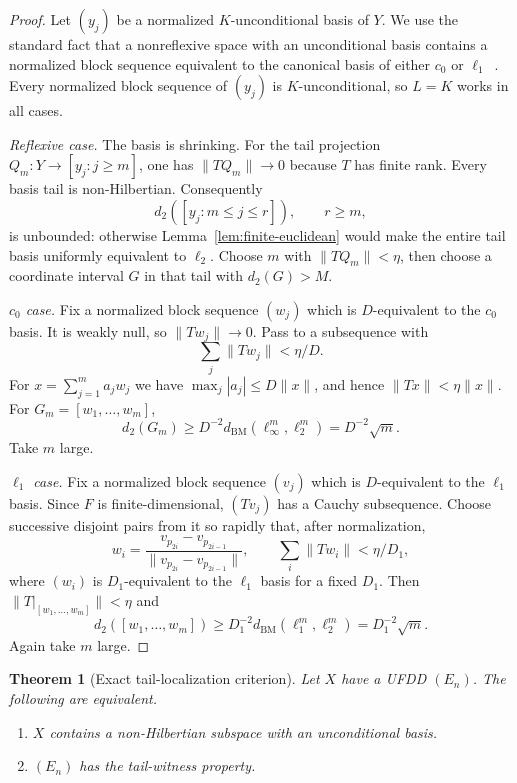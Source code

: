 \documentclass[11pt]{article}
\newtheorem{theorem}{Theorem}[section]
\theoremstyle{definition}
\newcommand{\dd}{d_2}
\newcommand{\BM}{d_{\mathrm{BM}}}
\begin{document}
\begin{proof}
Let $(y_j)$ be a normalized $K$-unconditional basis of $Y$.  We use the
standard fact that a nonreflexive space with an unconditional basis contains a
normalized block sequence equivalent to the canonical basis of either $c_0$ or
$\ell_1$~\cite{AK}.  Every normalized block sequence of $(y_j)$ is
$K$-unconditional, so $L=K$ works in all cases.

\emph{Reflexive case.}
The basis is shrinking.  For the tail projection
$Q_m:Y\to[y_j:j\geq m]$, one has $\|TQ_m\|\to0$ because $T$ has finite rank.
Every basis tail is non-Hilbertian.  Consequently
\[
 \dd([y_j:m\leq j\leq r]),\qquad r\geq m,
\]
is unbounded: otherwise Lemma~\ref{lem:finite-euclidean} would make the
entire tail basis uniformly equivalent to $\ell_2$.  Choose $m$ with
$\|TQ_m\|<\eta$, then choose a coordinate interval $G$ in that tail with
$\dd(G)>M$.

\emph{$c_0$ case.}
Fix a normalized block sequence $(w_j)$ which is $D$-equivalent to the
$c_0$ basis.  It is weakly null, so $\|Tw_j\|\to0$.  Pass to a subsequence
with
\[
  \sum_j\|Tw_j\|<\eta/D.
\]
For $x=\sum_{j=1}^m a_jw_j$ we have $\max_j|a_j|\leq D\|x\|$, and hence
$\|Tx\|<\eta\|x\|$.  For $G_m=[w_1,\ldots,w_m]$,
\[
  \dd(G_m)\geq D^{-2}\BM(\ell_\infty^m,\ell_2^m)
             =D^{-2}\sqrt m.
\]
Take $m$ large.

\emph{$\ell_1$ case.}
Fix a normalized block sequence $(v_j)$ which is $D$-equivalent to the
$\ell_1$ basis.  Since $F$ is finite-dimensional, $(Tv_j)$ has a Cauchy
subsequence.  Choose successive disjoint pairs from it so rapidly that, after
normalization,
\[
 w_i=\frac{v_{p_{2i}}-v_{p_{2i-1}}}
          {\|v_{p_{2i}}-v_{p_{2i-1}}\|},
 \qquad
 \sum_i\|Tw_i\|<\eta/D_1,
\]
where $(w_i)$ is $D_1$-equivalent to the $\ell_1$ basis for a fixed $D_1$.
Then $\|T|_{[w_1,\ldots,w_m]}\|<\eta$ and
\[
 \dd([w_1,\ldots,w_m])
 \geq D_1^{-2}\BM(\ell_1^m,\ell_2^m)
 =D_1^{-2}\sqrt m.
\]
Again take $m$ large.
\end{proof}

\begin{theorem}[Exact tail-localization criterion]\label{thm:equivalence}
Let $X$ have a UFDD $(E_n)$.  The following are equivalent.
\begin{enumerate}[label=(\alph*)]
\item $X$ contains a non-Hilbertian subspace with an unconditional basis.
\item $(E_n)$ has the tail-witness property.
\end{enumerate}
\end{theorem}
\end{document}
